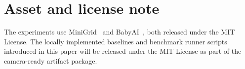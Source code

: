 \documentclass{article}
\begin{document}
\section{Asset and license note}
\label{app:assets}

The experiments use MiniGrid~\citep{MinigridMiniworld23} and BabyAI~\citep{chevalier2018babyai}, both released under the MIT License. The locally implemented baselines and benchmark runner scripts introduced in this paper will be released under the MIT License as part of the camera-ready artifact package.

\clearpage
\FloatBarrier

\end{document}
